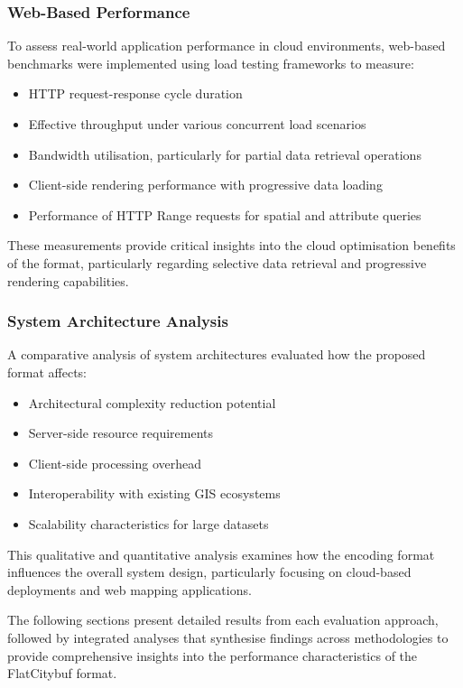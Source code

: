 \subsubsection{Web-Based Performance}
\label{result:overview:web_based_performance}

To assess real-world application performance in cloud environments, web-based benchmarks were implemented using load testing frameworks to measure:
\begin{itemize}
  \item HTTP request-response cycle duration
  \item Effective throughput under various concurrent load scenarios
  \item Bandwidth utilisation, particularly for partial data retrieval operations
  \item Client-side rendering performance with progressive data loading
  \item Performance of HTTP Range requests for spatial and attribute queries
\end{itemize}

These measurements provide critical insights into the cloud optimisation benefits of the format, particularly regarding selective data retrieval and progressive rendering capabilities.

\subsubsection{System Architecture Analysis}
\label{result:overview:system_architecture_analysis}

A comparative analysis of system architectures evaluated how the proposed format affects:
\begin{itemize}
  \item Architectural complexity reduction potential
  \item Server-side resource requirements
  \item Client-side processing overhead
  \item Interoperability with existing GIS ecosystems
  \item Scalability characteristics for large datasets
\end{itemize}

This qualitative and quantitative analysis examines how the encoding format influences the overall system design, particularly focusing on cloud-based deployments and web mapping applications.

The following sections present detailed results from each evaluation approach, followed by integrated analyses that synthesise findings across methodologies to provide comprehensive insights into the performance characteristics of the FlatCitybuf format.


